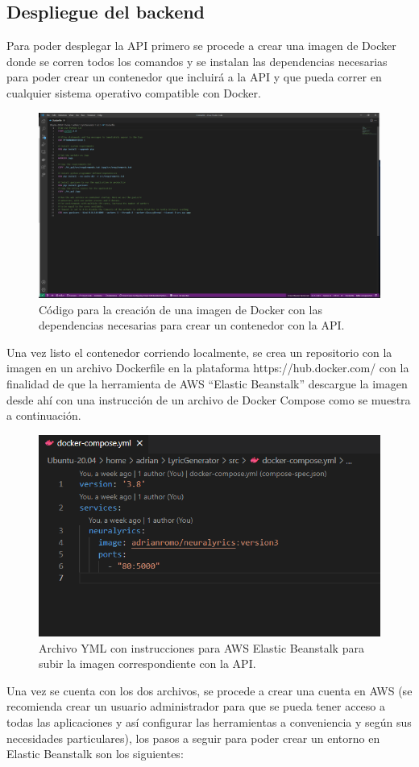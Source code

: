 \documentclass[12pt, a4paper, titlepage]{article}
\begin{document}
	\subsection{Despliegue del backend}
		Para poder desplegar la API primero se procede a crear una imagen de Docker donde se corren todos los comandos y se instalan las dependencias necesarias para poder crear un contenedor que incluirá a la API y que pueda correr en cualquier sistema operativo compatible con Docker.
		\begin{figure}[H]
			\includegraphics[width=12cm]{./Imagenes/BackEnd/dockerfile.png}
			\centering 
			\caption{Código para la creación de una imagen de Docker con las dependencias necesarias para crear un contenedor con la API.}
		\end{figure}
		Una vez listo el contenedor corriendo localmente, se crea un repositorio con la imagen en un archivo Dockerfile en la plataforma https://hub.docker.com/ con la finalidad de que la herramienta de AWS “Elastic Beanstalk” descargue la imagen desde ahí con una instrucción de un archivo de Docker Compose como se muestra a continuación.
		\begin{figure}[H]
			\includegraphics[width=12cm]{./Imagenes/BackEnd/dockercompose.png}
			\centering 
			\caption{Archivo YML con instrucciones para AWS Elastic Beanstalk para subir la imagen correspondiente con la API.}
		\end{figure}
		Una vez se cuenta con los dos archivos, se procede a crear una cuenta en AWS (se recomienda crear un usuario administrador para que se pueda tener acceso a todas las aplicaciones y así configurar las herramientas a conveniencia y según sus necesidades particulares), los pasos a seguir para poder crear un entorno en Elastic Beanstalk son los siguientes:
	
\end{document}
